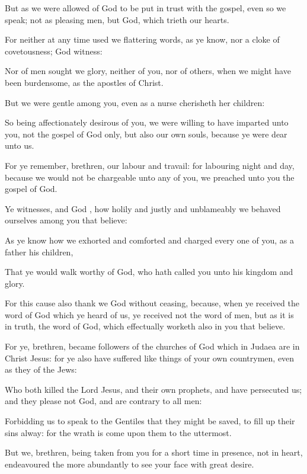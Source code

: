 {But
as we were
allowed
of
God to be put in trust
with the
gospel, even
so we
speak;
not
as
pleasing
men,
but
God,
which
trieth
our
hearts.

For
neither at any
time used
we
flattering
words,
as ye
know,
nor a
cloke of
covetousness;
God
{}
witness:

Nor
of
men sought
we
glory,
neither
of
you,
nor
{}
of
others, when we
might have
been
burdensome,
as the
apostles of
Christ.

But we
were
gentle
among
you,
even
as a
nurse
cherisheth
her
children:

So being affectionately
desirous of
you, we were
willing to have
imparted unto
you,
not the
gospel of
God
only,
but
also our
own
souls,
because ye
were
dear unto
us.

For ye
remember,
brethren,
our
labour
and
travail:
for
labouring
night
and
day,
because we
would
not be chargeable
unto
any of
you, we
preached
unto
you the
gospel of
God.

Ye
{}
witnesses,
and
God
{},
how
holily
and
justly
and
unblameably we behaved
ourselves among
you
that
believe:

As ye
know
how we
exhorted
and
comforted
and
charged
every
one of
you,
as a
father
{}
his
children,

That
ye would
walk
worthy of
God,
who hath
called
you
unto
his
kingdom
and
glory.


\par }{\PP {}For
this
cause
also
thank
we
God without
ceasing,
because, when ye
received the
word of
God which ye
heard
of
us, ye
received
{}
not
{} the
word of
men,
but
as it
is in
truth, the
word of
God,
which effectually
worketh
also
in
you
that
believe.

For
ye,
brethren,
became
followers of the
churches of
God
which
in
Judaea
are
in
Christ
Jesus:
for
ye
also have
suffered like
things
of your
own
countrymen,
even
as
they
{}
of the
Jews:

Who
both
killed the
Lord
Jesus,
and their
own
prophets,
and have
persecuted
us;
and they
please
not
God,
and are
contrary to
all
men:

Forbidding
us to
speak to the
Gentiles
that they might be
saved,
to fill
up
their
sins
alway:
for the
wrath is
come
upon
them
to the
uttermost.


\par }{\PP {}But
we,
brethren, being
taken
from
you
for a
short
time in
presence,
not in
heart,
endeavoured the more
abundantly to
see
your
face
with
great
desire.

}

